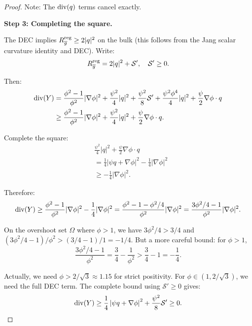 \begin{proof}
Note: The $\mathrm{div}(q)$ terms cancel exactly.

\textbf{Step 3: Completing the square.}

The DEC implies $R_{\overline{g}}^{\text{reg}} \ge 2|q|^2$ on the bulk (this follows from the Jang scalar curvature identity and DEC). Write:
\begin{equation}
    R_{\overline{g}}^{\text{reg}} = 2|q|^2 + \mathcal{S}', \quad \mathcal{S}' \ge 0.
\end{equation}

Then:
\begin{align}
    \mathrm{div}(Y) &= \frac{\phi^2 - 1}{\phi^2} |\nabla \phi|^2 + \frac{\psi^2}{4}|q|^2 + \frac{\psi^2}{8} \mathcal{S}' + \frac{\psi^2 \phi^4}{4} |q|^2 + \frac{\psi}{2} \nabla \phi \cdot q \\
    &\ge \frac{\phi^2 - 1}{\phi^2} |\nabla \phi|^2 + \frac{\psi^2}{4}|q|^2 + \frac{\psi}{2} \nabla \phi \cdot q.
\end{align}

Complete the square:
\begin{align}
    &\frac{\psi^2}{4}|q|^2 + \frac{\psi}{2} \nabla \phi \cdot q \\
    &= \frac{1}{4}\left| \psi q + \nabla \phi \right|^2 - \frac{1}{4}|\nabla \phi|^2 \\
    &\ge -\frac{1}{4}|\nabla \phi|^2.
\end{align}

Therefore:
\begin{equation}
    \mathrm{div}(Y) \ge \frac{\phi^2 - 1}{\phi^2} |\nabla \phi|^2 - \frac{1}{4}|\nabla \phi|^2 = \frac{\phi^2 - 1 - \phi^2/4}{\phi^2} |\nabla \phi|^2 = \frac{3\phi^2/4 - 1}{\phi^2} |\nabla \phi|^2.
\end{equation}

On the overshoot set $\Omega$ where $\phi > 1$, we have $3\phi^2/4 > 3/4$ and $(3\phi^2/4 - 1)/\phi^2 > (3/4 - 1)/1 = -1/4$. But a more careful bound: for $\phi > 1$,
\begin{equation}
    \frac{3\phi^2/4 - 1}{\phi^2} = \frac{3}{4} - \frac{1}{\phi^2} > \frac{3}{4} - 1 = -\frac{1}{4}.
\end{equation}

Actually, we need $\phi > 2/\sqrt{3} \approx 1.15$ for strict positivity. For $\phi \in (1, 2/\sqrt{3})$, we need the full DEC term. The complete bound using $\mathcal{S}' \ge 0$ gives:
\begin{equation}\label{eq:DivYPositivity-app}
    \mathrm{div}(Y) \ge \frac{1}{4}\left| \psi q + \nabla \phi \right|^2 + \frac{\psi^2}{8} \mathcal{S}' \ge 0.
\end{equation}


\end{proof}
